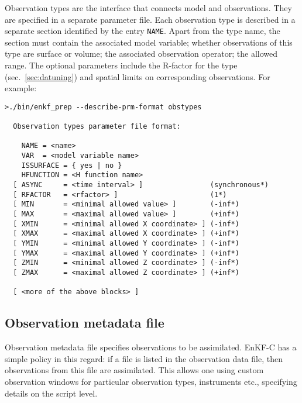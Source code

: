 \documentclass[11pt]{report}
\begin{document}
Observation types are the interface that connects model and observations.
They are specified in a separate parameter file.
Each observation type is described in a separate section identified by the entry \verb|NAME|.
Apart from the type name, the section must contain the associated model variable; whether observations of this type are surface or volume; the associated observation operator; the allowed range.
The optional parameters include the R-factor for the type (sec.~\ref{sec:datuning}) and spatial limits on corresponding observations.
For example:
\begin{Verbatim}[frame=single,fontsize=\footnotesize]
>./bin/enkf_prep --describe-prm-format obstypes

  Observation types parameter file format:

    NAME = <name>
    VAR  = <model variable name>
    ISSURFACE = { yes | no }
    HFUNCTION = <H function name>
  [ ASYNC     = <time interval> ]                (synchronous*)
  [ RFACTOR   = <rfactor> ]                      (1*)
  [ MIN       = <minimal allowed value> ]        (-inf*)
  [ MAX       = <maximal allowed value> ]        (+inf*)
  [ XMIN      = <minimal allowed X coordinate> ] (-inf*)
  [ XMAX      = <maximal allowed X coordinate> ] (+inf*)
  [ YMIN      = <minimal allowed Y coordinate> ] (-inf*)
  [ YMAX      = <maximal allowed Y coordinate> ] (+inf*)
  [ ZMIN      = <minimal allowed Z coordinate> ] (-inf*)
  [ ZMAX      = <maximal allowed Z coordinate> ] (+inf*)

  [ <more of the above blocks> ]
\end{Verbatim}

\subsection{Observation metadata file}

Observation metadata file specifies observations to be assimilated.
EnKF-C has a simple policy in this regard: if a file is listed in the observation data file, then observations from this file are assimilated.
This allows one using custom observation windows for particular observation types, instruments etc., specifying details on the script level.
\end{document}
